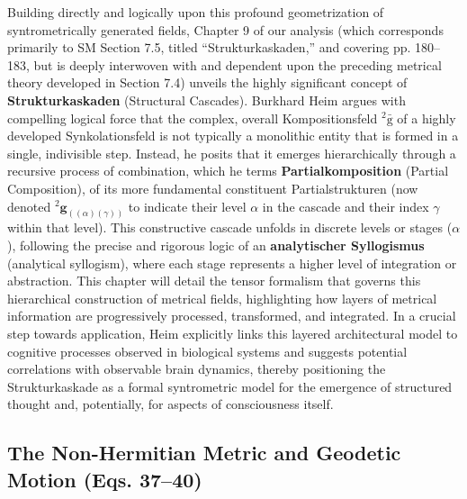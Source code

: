 \documentclass[12pt]{article}
\newcommand{\q}[1]{\enquote{#1}}
\newcommand{\kompositionsfeld}{{}^2\bar{\mathrm{g}}}
\newcommand{\partialstruktur}[1]{{}^2\mathbf{g}_{(#1)}}
\newcommand{\kaskadenstufe}{\alpha}
\begin{document}
Building directly and logically upon this profound geometrization of syntrometrically generated fields, Chapter 9 of our analysis (which corresponds primarily to SM Section 7.5, titled \q{Strukturkaskaden,} and covering pp. 180–183, but is deeply interwoven with and dependent upon the preceding metrical theory developed in Section 7.4) unveils the highly significant concept of \textbf{Strukturkaskaden} (Structural Cascades). Burkhard Heim argues with compelling logical force that the complex, overall Kompositionsfeld \( \kompositionsfeld \) of a highly developed Synkolationsfeld is not typically a monolithic entity that is formed in a single, indivisible step. Instead, he posits that it emerges hierarchically through a recursive process of combination, which he terms \textbf{Partialkomposition} (Partial Composition), of its more fundamental constituent Partialstrukturen (now denoted \( \partialstruktur{(\alpha)(\gamma)} \) to indicate their level \( \alpha \) in the cascade and their index \( \gamma \) within that level). This constructive cascade unfolds in discrete levels or stages (\(\kaskadenstufe\)), following the precise and rigorous logic of an \textbf{analytischer Syllogismus} (analytical syllogism), where each stage represents a higher level of integration or abstraction. This chapter will detail the tensor formalism that governs this hierarchical construction of metrical fields, highlighting how layers of metrical information are progressively processed, transformed, and integrated. In a crucial step towards application, Heim explicitly links this layered architectural model to cognitive processes observed in biological systems and suggests potential correlations with observable brain dynamics, thereby positioning the Strukturkaskade as a formal syntrometric model for the emergence of structured thought and, potentially, for aspects of consciousness itself.

\subsection{The Non-Hermitian Metric and Geodetic Motion (Eqs. 37--40)}
\label{sec:field_metric_motion}
\end{document}
